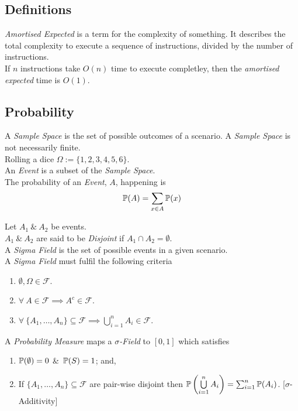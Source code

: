 \documentclass[11pt,a4paper]{article}
\begin{document}
\subsection{Definitions}

\textit{Amortised Expected} is a term for the complexity of something. It describes the total complexity to execute a sequence of instructions, divided by the number of instructions.\\
\eg If $n$ instructions take $O(n)$ time to execute completley, then the \textit{amortised expected} time is $O(1)$.

\subsection{Probability}

A \textit{Sample Space} is the set of possible outcomes of a scenario. A \textit{Sample Space} is not necessarily finite.\\
\eg Rolling a dice $\Omega:=\{1,2,3,4,5,6\}$.\\

An \textit{Event} is a subset of the \textit{Sample Space}.\\
The probability of an \textit{Event}, $A$, happening is
$$\mathbb{P}(A)=\sum_{x\in A}\mathbb{P}(x)$$

Let $A_1\ \&\ A_2$ be events.\\
$A_1\ \&\ A_2$ are said to be \textit{Disjoint} if $A_1\cap A_2=\emptyset$.\\

A \textit{Sigma Field} is the set of possible events in a given scenario.\\
A \textit{Sigma Field} must fulfil the following criteria
\begin{enumerate}
	\item $\emptyset,\Omega\in\mathcal{F}$.
	\item $\forall\ A\in\mathcal{F}\implies A^c\in\mathcal{F}$.
	\item $\forall\ \{A_1,\dots,A_n\}\subseteq\mathcal{F}\implies\bigcup\limits_{i=1}^nA_i\in\mathcal{F}$.
\end{enumerate}

A \textit{Probability Measure} maps a \textit{$\sigma$-Field} to $[0,1]$ which satisfies
\begin{enumerate}
	\item $\mathbb{P}(\emptyset)=0$ \&\ $\mathbb{P}(S)=1$; and,
	\item If $\{A_1,\dots,A_n\}\subseteq\mathcal{F}$ are pair-wise disjoint then $\mathbb{P}\left(\bigcup\limits_{i=1}^nA_i\right)=\sum_{i=1}^n\mathbb{P}(A_i)$. [$\sigma$-Additivity]
\end{enumerate}
\end{document}
